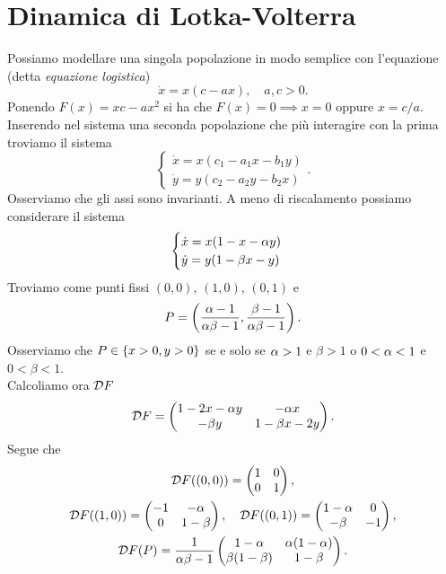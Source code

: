 \section{Dinamica di Lotka-Volterra}
Possiamo modellare una singola popolazione in modo semplice con l'equazione (detta \textit{equazione logistica})
\[\dot x=x(c-a x),\quad a,c>0.\]
Ponendo $F(x)=xc-ax^2$ si ha che $F(x)=0\implies x=0$ oppure $x=c/a$.\\
Inserendo nel sistema una seconda popolazione che pi\`u interagire con la prima troviamo il sistema
\[\begin{cases}
\dot x=x(c_1-a_1x-b_1y)\\
\dot y=y(c_2-a_2y-b_2x)
\end{cases}.
\]
Osserviamo che gli assi sono invarianti. A meno di riscalamento possiamo considerare il sistema
\[\begin{cases}
\dot x=x(1-x-\alpha y)\\
\dot y=y(1-\beta x-y)
\end{cases}\]
Troviamo come punti fissi $(0,0)$, $(1,0)$, $(0,1)$ e
\[P=\left({\frac{\alpha-1}{\alpha\beta-1},\frac{\beta-1}{\alpha\beta-1}}\right).\]
Osserviamo che $P\in\left\{{x>0,y>0}\right\}$ se e solo se $\alpha>1$ e $\beta>1$ o $0<\alpha<1$ e $0<\beta<1$.\\
Calcoliamo ora $\mathcal{D} F$
\[\mathcal{D} F=\begin{pmatrix}1-2x-\alpha y & -\alpha x\\ -\beta y & 1-\beta x-2y\end{pmatrix}.\]
Segue che
\begin{gather*}
\mathcal{D} F((0,0))=\begin{pmatrix}1 & 0\\ 0 & 1\end{pmatrix},\\
\mathcal{D} F((1,0))=\begin{pmatrix}-1 & -\alpha\\ 0 &1-\beta\end{pmatrix},\quad
\mathcal{D} F((0,1))=\begin{pmatrix}1-\alpha & 0\\ -\beta & -1\end{pmatrix},\\
\mathcal{D} F(P)=\frac 1{\alpha \beta -1}\begin{pmatrix}
    1-\alpha &
    \alpha(1-\alpha)\\
    \beta(1-\beta) &
    1-\beta
\end{pmatrix}.
\end{gather*}

